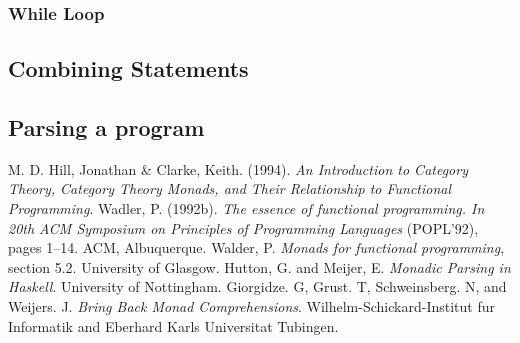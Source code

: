 \documentclass[a4paper, onecolumn]{article}
\begin{document}
    \subsubsection{While Loop}
    
    \subsection{Combining Statements}
    
    \subsection{Parsing a program}
    
    
    
    
    \begin{thebibliography}{9}
    M. D. Hill, Jonathan & Clarke, Keith. (1994). \textit{An Introduction to Category Theory, Category Theory Monads, and Their Relationship to Functional Programming}.
    Wadler, P. (1992b). \textit{The essence of functional programming. In
    20th ACM Symposium on Principles of Programming Languages}
    (POPL’92), pages 1–14. ACM, Albuquerque.
    Walder, P. \textit{Monads for functional programming}, section 5.2. University of Glasgow. 
    Hutton, G. and Meijer, E. \textit{Monadic Parsing in Haskell}. University of Nottingham.
    Giorgidze. G, Grust. T, Schweinsberg. N, and Weijers. J. \textit{Bring Back Monad Comprehensions}. Wilhelm-Schickard-Institut fur Informatik and Eberhard Karls Universitat Tubingen.
    \end{thebibliography}
    
\end{document}
